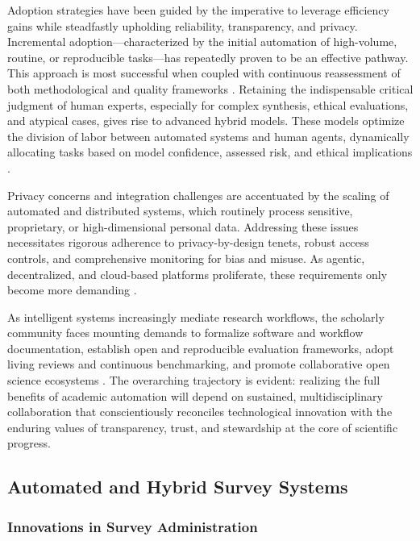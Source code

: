 \documentclass[sigconf]{acmart}
\begin{document}
Adoption strategies have been guided by the imperative to leverage efficiency gains while steadfastly upholding reliability, transparency, and privacy. Incremental adoption—characterized by the initial automation of high-volume, routine, or reproducible tasks—has repeatedly proven to be an effective pathway. This approach is most successful when coupled with continuous reassessment of both methodological and quality frameworks \cite{ref28,ref31,ref51,ref78}. Retaining the indispensable critical judgment of human experts, especially for complex synthesis, ethical evaluations, and atypical cases, gives rise to advanced hybrid models. These models optimize the division of labor between automated systems and human agents, dynamically allocating tasks based on model confidence, assessed risk, and ethical implications \cite{ref51,ref64,ref83,ref96,ref97}.

Privacy concerns and integration challenges are accentuated by the scaling of automated and distributed systems, which routinely process sensitive, proprietary, or high-dimensional personal data. Addressing these issues necessitates rigorous adherence to privacy-by-design tenets, robust access controls, and comprehensive monitoring for bias and misuse. As agentic, decentralized, and cloud-based platforms proliferate, these requirements only become more demanding \cite{ref61,ref62,ref80,ref102,ref112,ref113}.

As intelligent systems increasingly mediate research workflows, the scholarly community faces mounting demands to formalize software and workflow documentation, establish open and reproducible evaluation frameworks, adopt living reviews and continuous benchmarking, and promote collaborative open science ecosystems \cite{ref28,ref31,ref51,ref70,ref78,ref80}. The overarching trajectory is evident: realizing the full benefits of academic automation will depend on sustained, multidisciplinary collaboration that conscientiously reconciles technological innovation with the enduring values of transparency, trust, and stewardship at the core of scientific progress.

\subsection{Automated and Hybrid Survey Systems}

\subsubsection{Innovations in Survey Administration}
\end{document}

